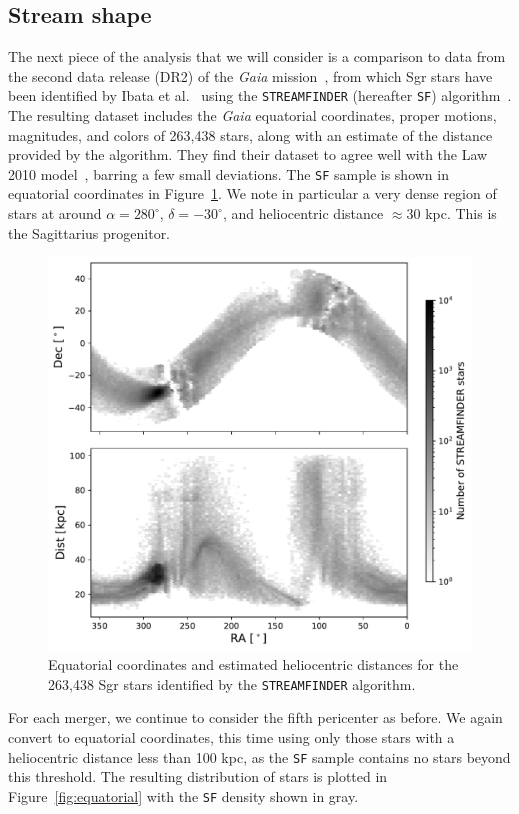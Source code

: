 \hypertarget{stream-shape}{%
\subsection{Stream shape}\label{stream-shape}}

The next piece of the analysis that we will consider is a comparison to data
from the second data release (DR2) of the \textit{Gaia}
mission~\cite{lindegren_gaia_2018,gaia_collaboration_gaia_2018}, from which Sgr
stars have been identified by Ibata et al.~\cite{ibata_panoramic_2020} using the
\verb|STREAMFINDER| (hereafter \verb|SF|)
algorithm~\cite{malhan_streamfinder_2018, malhan_ghostly_2018}.  The resulting
dataset includes the \textit{Gaia} equatorial coordinates, proper motions,
magnitudes, and colors of 263,438 stars, along with an estimate of the
distance provided by the algorithm.  They find their dataset to agree well
with the Law 2010 model~\cite{law_sagittarius_2010}, barring a few small
deviations.  The \verb|SF| sample is shown in equatorial coordinates in
Figure~\ref{fig:streamfinder}.  We note in particular a very dense region of
stars at around $\alpha = 280^\circ$, $\delta = -30^\circ$, and heliocentric
distance $\approx 30$ kpc.  This is the Sagittarius progenitor.

\begin{figure}
    \centering 
    \includegraphics[width=0.7\linewidth]{figs/streamfinder.pdf}
    \caption{%
        Equatorial coordinates and estimated heliocentric distances for the
        263,438 Sgr stars identified by the \texttt{STREAMFINDER} algorithm.
    }
    \label{fig:streamfinder}
\end{figure}

For each merger, we continue to consider the fifth pericenter as before. We
again convert to equatorial coordinates, this time using only those stars with a
heliocentric distance less than 100 kpc, as the \verb|SF| sample
contains no stars beyond this threshold. The resulting distribution of stars is
plotted in Figure~\ref{fig:equatorial} with the \verb|SF| density
shown in gray.

